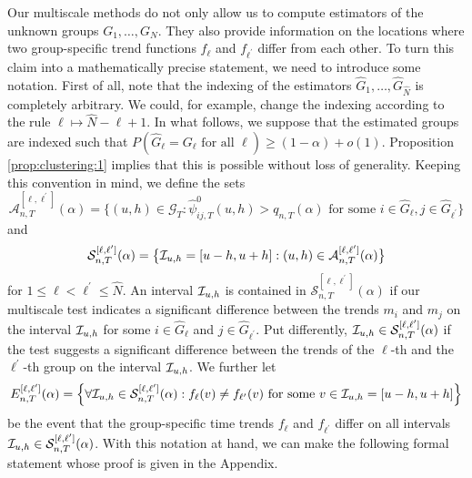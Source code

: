 \documentclass[a4paper,12pt]{article}
\begin{document}
Our multiscale methods do not only allow us to compute estimators of the unknown groups $G_1,\ldots, G_N$. They also provide information on the locations where two group-specific trend functions $f_\ell$ and $f_{\ell^\prime}$ differ from each other. To turn this claim into a mathematically precise statement, we need to introduce some notation. First of all, note that the indexing of the estimators $\widehat{G}_1,\ldots,\widehat{G}_{\widehat{N}}$ is completely arbitrary. We could, for example, change the indexing according to the rule $\ell \mapsto \widehat{N} - \ell + 1$. In what follows, we suppose that the estimated groups are indexed such that $P( \widehat{G}_\ell = G_\ell \text{ for all } \ell ) \ge (1-\alpha) + o(1)$. Proposition \ref{prop:clustering:1} implies that this is possible without loss of generality. Keeping this convention in mind, we define the sets 
\[ \mathcal{A}_{n,T}^{[\ell,\ell^\prime]}(\alpha)= \Big\{ (u, h) \in \mathcal{G}_T: \widehat{\psi}^0_{ij, T}(u, h) > q_{n,T}(\alpha) \text{ for some } i \in \widehat{G}_\ell, j \in \widehat{G}_{\ell^\prime} \Big\} \]
and  
\[ \mathcal{S}^{[\ell,\ell^\prime]}_{n, T}(\alpha) = \big\{ \mathcal{I}_{u, h} = [u-h, u+h]: (u, h) \in \mathcal{A}_{n,T}^{[\ell,\ell^\prime]}(\alpha) \big\} \]
for $1 \le \ell < \ell^\prime \le \widehat{N}$. An interval $\mathcal{I}_{u, h}$ is contained in $\mathcal{S}^{[\ell,\ell^\prime]}_{n, T}(\alpha)$ if our multiscale test indicates a significant difference between the trends $m_i$ and $m_j$ on the interval $\mathcal{I}_{u, h}$ for some $i \in \widehat{G}_\ell$ and $j \in \widehat{G}_{\ell^\prime}$. Put differently, $\mathcal{I}_{u, h} \in \mathcal{S}^{[\ell,\ell^\prime]}_{n, T}(\alpha)$ if the test suggests a significant difference between the trends of the $\ell$-th and the $\ell^\prime$-th group on the interval $\mathcal{I}_{u, h}$. We further let
\[ E_{n,T}^{[\ell,\ell^\prime]}(\alpha) = \Big\{ \forall \mathcal{I}_{u, h} \in \mathcal{S}^{[\ell,\ell^\prime]}_{n, T}(\alpha): f_\ell(v) \ne f_{\ell^\prime}(v) \text{ for some } v \in \mathcal{I}_{u, h} = [u-h, u+h] \Big\} \]
be the event that the group-specific time trends $f_\ell$ and $f_{\ell^\prime}$ differ on all intervals $\mathcal{I}_{u, h} \in \mathcal{S}^{[\ell,\ell^\prime]}_{n, T}(\alpha)$. With this notation at hand, we can make the following formal statement whose proof is given in the Appendix.
\end{document}
